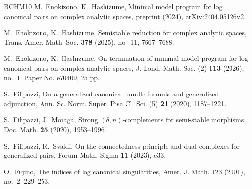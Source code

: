 \documentclass[12pt]{amsart}
\theoremstyle{definition}
\begin{document}
\begin{thebibliography}{BCHM10}
 M.~Enokizono, K.~Hashizume, Minimal model program for log canonical pairs on complex analytic spaces, preprint (2024), arXiv:2404.05126v2. 

 M.~Enokizono, K.~Hashizume, Semistable reduction for complex analytic spaces, Trans. Amer. Math. Soc. {\textbf{378}} (2025), no.~11, 7667--7688.

 M.~Enokizono, K.~Hashizume, On termination of minimal model program for log canonical pairs on complex analytic spaces, J. Lond. Math. Soc. (2) {\textbf{113}} (2026), no.~1, Paper No. e70409, 25 pp. 

 S.~Filipazzi, On a generalized canonical bundle 
formula and generalized adjunction, Ann. Sc. Norm. Super. Pisa Cl. Sci. (5) \textbf{21} (2020), 1187--1221. 

 S.~Filipazzi, J.~Moraga, Strong $(\delta,n)$-complements for semi-stable morphisms, Doc. Math. {\textbf{25}} (2020), 1953--1996.

 S.~Filipazzi, R.~Svaldi, On the connectedness principle and dual complexes for generalized pairs, Forum Math. Sigma {\textbf{11}} (2023), e33.  




 O.~Fujino, The indices of log canonical singularities, Amer. J. Math. 123 (2001), no.~2, 229--253.






\end{thebibliography}
\end{document}
